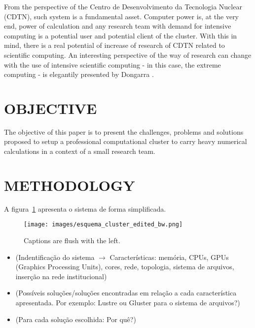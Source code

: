 \documentclass[twoside,a4paper,12pt,english]{inac17}
\begin{document}
From the perspective of the Centro de Desenvolvimento da Tecnologia Nuclear (CDTN), such system
is a fundamental asset. Computer power is, at the very end, power of calculation and any research
team with demand for intensive computing is a potential user and potential client of the cluster.
With this in mind, there is a real potential of increase of research of CDTN related to
scientific computing. An interesting perspective of the way of research can change with the
use of intensive scientific computing - in this case, the extreme computing - is elegantily
presented by Dongarra \cite{Dongarra2017}.



\section{OBJECTIVE}

The objective of this paper is to present the challenges, problems and solutions proposed
to setup a professional computational cluster to carry heavy numerical calculations in a
context of a small research team.



\section{METHODOLOGY}


  A figura~\ref{fig:esquema-cluster} apresenta o sistema de forma simplificada.
  
\begin{figure}[h] %
  \centering\texttt{[image: images/esquema\_cluster\_edited\_bw.png]}
  \caption{Captions are flush with the left.}
  \label{fig:esquema-cluster}
\end{figure}

\begin{itemize}

\item (Indentificação do sistema $\rightarrow$ Características: memória, CPUs, GPUs (Graphics Processing Units), cores, rede, topologia, sistema de arquivos, inserção na rede institucional)

\item (Possíveis soluções/soluções encontradas em relação a cada característica apresentada. Por exemplo: Lustre \cite{Lustre} ou Gluster\cite{Gluster} para o sistema de arquivos?)

\item (Para cada solução escolhida: Por quê?)
  
\end{itemize}
\end{document}
